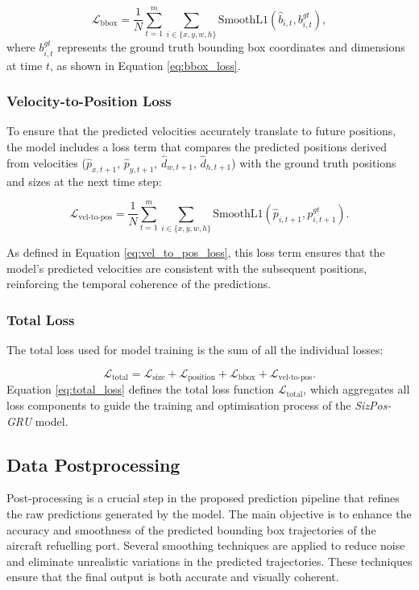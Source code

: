 \documentclass[12pt,oneside]{book} %
\begin{document}
\begin{equation}
    \mathcal{L}_{\text{bbox}} = \frac{1}{N} \sum_{t=1}^{m} \sum_{i \in \{x, y, w, h\}} \text{SmoothL1}\left(\hat{b}_{i,t}, b^{gt}_{i,t}\right), \label{eq:bbox_loss}
\end{equation}
where \(b^{gt}_{i,t}\) represents the ground truth bounding box coordinates and
dimensions at time \(t\), as shown in Equation \eqref{eq:bbox_loss}.

\subsubsection*{Velocity-to-Position Loss}
\noindent To ensure that the predicted velocities accurately translate to future positions, the model includes a loss term that compares the predicted positions derived from velocities (\(\hat{p}_{x,t+1}\), \(\hat{p}_{y,t+1}\), \(\hat{d}_{w,t+1}\), \(\hat{d}_{h,t+1}\)) with the ground truth positions and sizes at the next time step:

\begin{equation}
    \mathcal{L}_{\text{vel-to-pos}} = \frac{1}{N} \sum_{t=1}^{m} \sum_{i \in \{x, y, w, h\}} \text{SmoothL1}\left(\hat{p}_{i,t+1}, p^{gt}_{i,t+1}\right). \label{eq:vel_to_pos_loss}
\end{equation}

As defined in Equation \eqref{eq:vel_to_pos_loss}, this loss term ensures that
the model's predicted velocities are consistent with the subsequent positions,
reinforcing the temporal coherence of the predictions.

\subsubsection*{Total Loss}
\noindent The total loss used for model training is the sum of all the individual losses:

\begin{equation}
    \mathcal{L}_{\text{total}} = \mathcal{L}_{\text{size}} + \mathcal{L}_{\text{position}} + \mathcal{L}_{\text{bbox}} + \mathcal{L}_{\text{vel-to-pos}}. \label{eq:total_loss}
\end{equation}
Equation \eqref{eq:total_loss} defines the total loss function
\(\mathcal{L}_{\text{total}}\), which aggregates all loss components to guide
the training and optimisation process of the \textit{SizPos-GRU} model.

\subsection{Data Postprocessing}
Post-processing is a crucial step in the proposed prediction pipeline that
refines the raw predictions generated by the model. The main objective is to
enhance the accuracy and smoothness of the predicted bounding box trajectories
of the aircraft refuelling port. Several smoothing techniques are applied to
reduce noise and eliminate unrealistic variations in the predicted
trajectories. These techniques ensure that the final output is both accurate
and visually coherent.
\end{document}
